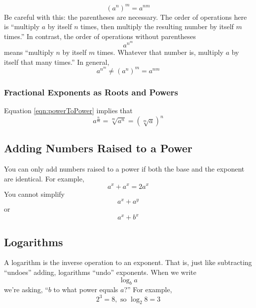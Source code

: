 \begin{equation} \label{eqn:powerToPower}
    (a^n)^m = a^{nm}
\end{equation}
Be careful with this: the parentheses are necessary. The order of operations here is ``multiply $a$ by itself $n$ times, then multiply the resulting number by itself $m$ 
times.'' In contrast, the order of operations without parentheses
\begin{equation*}
    a^{n^m}
\end{equation*}
means ``multiply $n$ by itself $m$ times. Whatever that number is, multiply $a$ by itself that many times.'' In general,
\begin{equation*}
    a^{n^m} \neq (a^n)^m  = a^{nm}
\end{equation*}

\subsubsection{Fractional Exponents as Roots and Powers}
Equation \eqref{eqn:powerToPower} implies that 
\begin{equation*}
    a^{\frac{n}{m}} = \sqrt[m]{a^n} = \left(\sqrt[m]{a}\right)^n
\end{equation*}

\subsection{Adding Numbers Raised to a Power}

You can only add numbers raised to a power if both the base and the exponent are identical. For example,
\begin{equation*}
    a^x + a^x = 2 a^x
\end{equation*}
You cannot simplify
\begin{equation*}
    a^x + a^y
\end{equation*}
or 
\begin{equation*}
    a^x + b^x
\end{equation*}

\subsection{Logarithms}

A logarithm is the inverse operation to an exponent. That is, just like subtracting ``undoes'' adding, logarithms ``undo'' exponents. When we write 
\begin{equation*}
    \log_b a 
\end{equation*}
we're asking, ``$b$ to what power equals $a$?'' For example, 
\begin{equation*}
    2^3 = 8, \text{ so } \log_2 8 = 3
\end{equation*}

